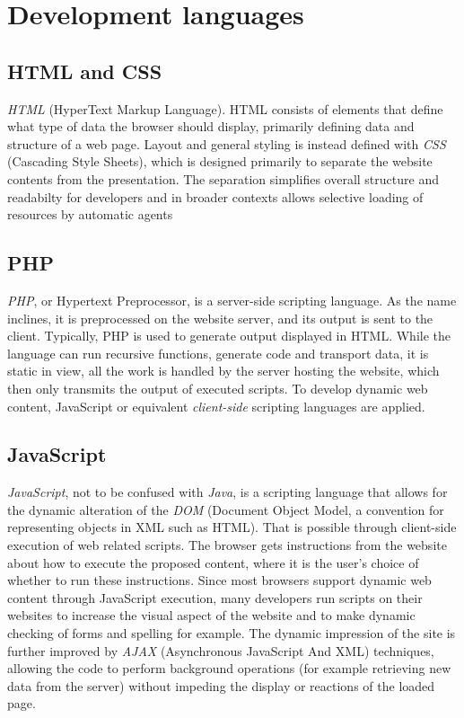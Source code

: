 \section{Development languages}

\subsection*{HTML and CSS}
\label{program_tools_html_css}
\emph{HTML} (HyperText Markup Language). HTML consists of elements that define what type of data the browser should display, primarily defining data and structure of a web page. Layout and general styling is instead defined with \emph{CSS} (Cascading Style Sheets), which is designed primarily to separate the website contents from the presentation.
The separation simplifies overall structure and readabilty for developers and in broader contexts allows selective loading of resources by automatic agents\cite{html}\cite{css}

\subsection*{PHP}
\emph{PHP}, or Hypertext Preprocessor, is a server-side scripting language. As the name inclines, it is preprocessed on the website server, and its output is sent to the client. Typically, PHP is used to generate output displayed in HTML. While the language can run recursive functions, generate code and transport data, it is static in view, all the work is handled by the server hosting the website, which then only transmits the output of executed scripts. To develop dynamic web content, JavaScript or equivalent \emph{client-side} scripting languages are applied.\cite{php}

\subsection*{JavaScript}
\emph{JavaScript}, not to be confused with \emph{Java}, is a scripting language that allows for the dynamic alteration of the \emph{DOM} (Document Object Model, a convention for representing objects in XML such as HTML). That is possible through client-side execution of web related scripts. The browser gets instructions from the website about how to execute the proposed content, where it is the user's choice of whether to run these instructions.
Since most browsers support dynamic web content through JavaScript execution, many developers run scripts on their websites to increase the visual aspect of the website and to make dynamic checking of forms and spelling for example.\cite{javascript} The dynamic impression of the site is further improved by \emph{AJAX} (Asynchronous JavaScript And XML) techniques, allowing the code to perform background operations (for example retrieving new data from the server) without impeding the display or reactions of the loaded page.
